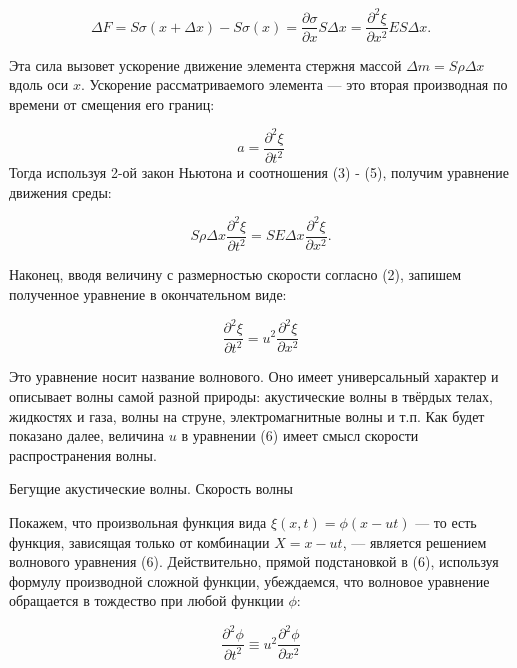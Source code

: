 \documentclass[12pt, a4paper]{article}
\begin{document}
\begin{equation}
    \Delta F = S\sigma(x + \Delta x) - S\sigma(x) = \frac{\partial\sigma}{\partial x} S\Delta x = \frac{\partial^2\xi}{\partial x^2}ES\Delta x.
\end{equation}

Эта сила вызовет ускорение движение элемента стержня массой $\Delta m = S\rho\Delta x$ вдоль оси $x$. Ускорение рассматриваемого элемента --- это вторая
производная по времени от смещения его границ: 

\begin{displaymath}
    a = \frac{\partial^2\xi}{\partial t^2}
\end{displaymath}
Тогда используя 2-ой закон Ньютона и соотношения (3) - (5), получим уравнение движения среды:

\begin{displaymath}
    S\rho\Delta x\frac{\partial^2\xi}{\partial t^2} = SE\Delta x\frac{\partial^2\xi}{\partial x^2}.
\end{displaymath}

Наконец, вводя величину с размерностью скорости согласно (2), запишем полученное уравнение в окончательном виде:

\begin{equation}
    \frac{\partial^2\xi}{\partial t^2} = u^2\frac{\partial^2\xi}{\partial x^2}
\end{equation}

Это уравнение носит название волнового. Оно имеет универсальный характер и описывает волны самой разной природы: акустические волны в
твёрдых телах, жидкостях и газа, волны на струне, электромагнитные
волны и т.п. Как будет показано далее, величина $u$ в уравнении (6) имеет
смысл скорости распространения волны.

\vspace{1cm}
{\large Бегущие акустические волны. Скорость волны \\}

Покажем, что произвольная функция вида $\xi(x,t) = \phi(x - ut)$ --- то есть
функция, зависящая только от комбинации $X = x - ut$, — является решением волнового уравнения (6). Действительно, прямой подстановкой в (6),
используя формулу производной сложной функции, убеждаемся, что волновое уравнение обращается в тождество при любой функции $\phi$:

\begin{displaymath}
    \frac{\partial^2\phi}{\partial t^2} \equiv u^2 \frac{\partial^2\phi}{\partial x^2}
\end{displaymath}
\end{document}

